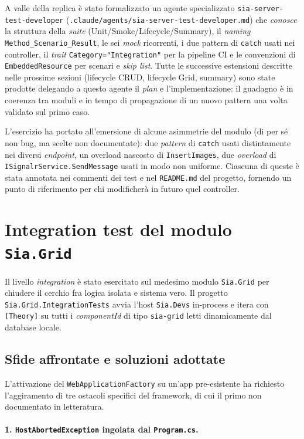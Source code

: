 A valle della replica è stato formalizzato un agente specializzato \texttt{sia-server-test-developer} (\texttt{.claude/agents/sia-server-test-developer.md}) che \emph{conosce} la struttura della \emph{suite} (Unit/Smoke/Lifecycle/Summary), il \emph{naming} \texttt{Method\_Scenario\_Result}, le sei \emph{mock} ricorrenti, i due pattern di \texttt{catch} usati nei controller, il \emph{trait} \texttt{Category="Integration"} per la pipeline CI e le convenzioni di \texttt{EmbeddedResource} per scenari e \emph{skip list}. Tutte le successive estensioni descritte nelle prossime sezioni (lifecycle CRUD, lifecycle Grid, summary) sono state prodotte delegando a questo agente il \emph{plan} e l'implementazione: il guadagno è in coerenza tra moduli e in tempo di propagazione di un nuovo pattern una volta validato sul primo caso.

L'esercizio ha portato all'emersione di alcune asimmetrie del modulo (di per sé non bug, ma scelte non documentate): due \emph{pattern} di \texttt{catch} usati distintamente nei diversi \emph{endpoint}, un overload nascosto di \texttt{InsertImages}, due \emph{overload} di \texttt{ISignalrService.SendMessage} usati in modo non uniforme. Ciascuna di queste è stata annotata nei commenti dei test e nel \texttt{README.md} del progetto, fornendo un punto di riferimento per chi modificherà in futuro quel controller.

\section{Integration test del modulo \texttt{Sia.Grid}}

Il livello \emph{integration} è stato esercitato sul medesimo modulo \texttt{Sia.Grid} per chiudere il cerchio fra logica isolata e sistema vero. Il progetto \texttt{Sia.Grid.IntegrationTests} avvia l'host \texttt{Sia.Devs} in-process e itera con \texttt{[Theory]} su tutti i \emph{componentId} di tipo \texttt{sia-grid} letti dinamicamente dal database locale.

\subsection{Sfide affrontate e soluzioni adottate}

L'attivazione del \texttt{WebApplicationFactory} su un'app pre-esistente ha richiesto l'aggiramento di tre ostacoli specifici del framework, di cui il primo non documentato in letteratura.

\paragraph{1. \texttt{HostAbortedException} ingoiata dal \texttt{Program.cs}.}

